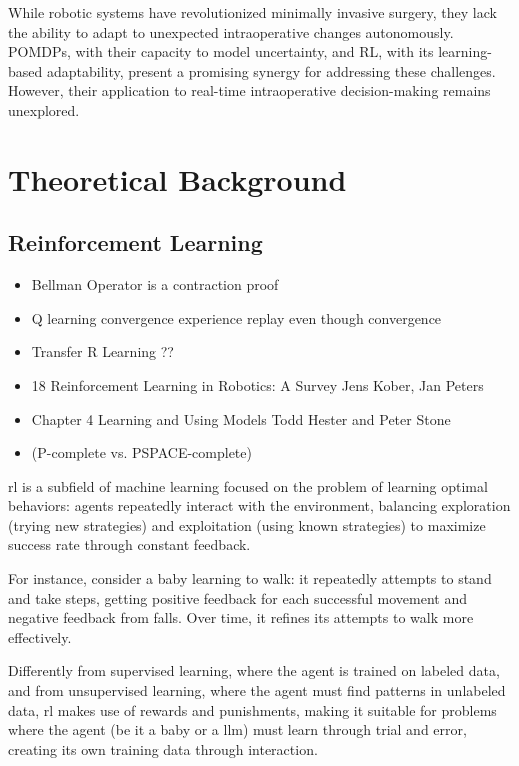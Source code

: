 \documentclass[a4paper,11pt]{report}
\theoremstyle{definition}
\theoremstyle{plain}
\theoremstyle{remark}  %
\begin{document}
While robotic systems have revolutionized minimally invasive surgery, they lack the 
ability to adapt to unexpected intraoperative changes autonomously. POMDPs, with 
their capacity to model uncertainty, and RL, with its learning-based adaptability, 
present a promising synergy for addressing these challenges. However, their 
application to real-time intraoperative decision-making remains unexplored.

\part{Theoretical Background}


\chapter{Reinforcement Learning}

\begin{itemize}
    \item Bellman Operator is a contraction proof
    \item Q learning convergence experience replay even though convergence
    \item Transfer R Learning ??
    \item 18 Reinforcement Learning in Robotics: A Survey Jens Kober, Jan Peters
    \item Chapter 4
            Learning and Using Models
            Todd Hester and Peter Stone
    \item (P-complete vs. PSPACE-complete)
\end{itemize}

\gls{rl} is a subfield of machine learning focused on the problem of learning 
optimal behaviors: agents repeatedly interact with the environment, balancing 
exploration (trying new strategies) and exploitation (using known strategies) 
to maximize success rate through constant feedback. \

For instance, consider a baby learning to walk: it repeatedly attempts to stand 
and take steps, getting positive feedback for each successful movement and 
negative feedback from falls. Over time, it refines its attempts to walk 
more effectively. \

Differently from supervised learning, where the agent is trained on labeled data, 
and from unsupervised learning, where the agent must find patterns in unlabeled data,
\gls{rl} makes use of rewards and punishments, making it suitable for problems 
where the agent (be it a baby or a \gls{llm}) must learn through trial and error, creating its own training data 
through interaction.
\end{document}

